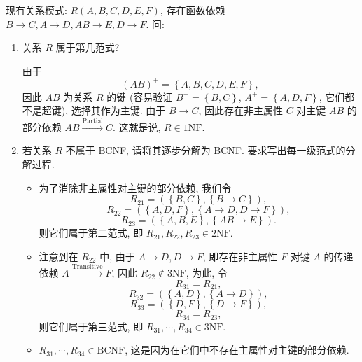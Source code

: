 \documentclass[10pt,UTF8]{book} %
\begin{document}
\begin{example}
    现有关系模式: $R(A, B, C, D, E, F)$,
    存在函数依赖 
    $B \rightarrow C, A \rightarrow D, 
    A B \rightarrow E, D \rightarrow F$. 问:
    \begin{enumerate}[label={$\left.\arabic*\right)$}, itemsep=0pt]
        \item 关系 $R$ 属于第几范式?
        \begin{sol}
            由于
            \[ (AB)^+ = \left\{
                A,B, C, D, E, F
            \right\}, \]
            因此 $AB$ 为关系 $R$ 的键 (容易验证
            $B^+ = \left\{ B,C \right\}$,
            $A^+ = \left\{ A, D, F \right\}$,
            它们都不是超键), 选择其作为主键.
            由于 $B \to C$, 因此存在非主属性 $C$ 对主键 $AB$
            的部分依赖 $AB \xrightarrow{\mathrm{Partial}} C$.
            这就是说, $R \in \mathrm{1NF}$.
        \end{sol}
        \item 若关系 $R$ 不属于 BCNF, 请将其逐步分解为 BCNF.
        要求写出每一级范式的分解过程.
        \begin{itemize}[itemsep=0pt]
            \item 为了消除非主属性对主键的部分依赖, 我们令
            \[ R_{21} = \left(
                \left\{B, C\right\}, \left\{
                    B \to C
                \right\}
            \right), \] \[ R_{22} = \left(
                \left\{ A, D, F \right\},
                \left\{ A \to D, D \to F \right\}
            \right), \] \[ R_{23} = \left(
                \left\{ A, B, E \right\},
                \left\{
                    AB \to E
                \right\}
            \right). \] 则它们属于第二范式, 即 $R_{21}, R_{22}, R_{23} \in \mathrm{2NF}$.
            \item 注意到在 $R_{22}$ 中, 由于 $A \to D, D \to F$,
            即存在非主属性 $F$ 对键 $A$ 的传递依赖 $A \xrightarrow{\mathrm{Transitive}} F$,
            因此 $R_{22} \notin \mathrm{3NF}$, 为此, 令
            \[ R_{31} = R_{21}, \] \[ R_{32} = \left(
                \left\{ A, D \right\}, \left\{ A \to D \right\}
            \right), \]  \[ R_{33} = \left(
                \left\{ D, F \right\}, \left\{ D \to F \right\}
            \right),\] \[ R_{34} = R_{23}, \] 则它们属于第三范式,
            即 $R_{31}, \cdots, R_{34} \in \mathrm{3NF}$.
            \item  $R_{31}, \cdots, R_{34} \in \mathrm{BCNF}$,
            这是因为在它们中不存在主属性对主键的部分依赖.
        \end{itemize}
    \end{enumerate}
\end{example}
\end{document}
